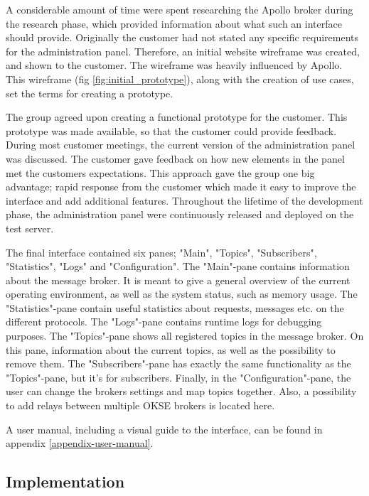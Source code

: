 A considerable amount of time were spent researching the Apollo broker during the research phase, which provided information about what such an interface should provide. Originally the customer had not stated any specific requirements for the administration panel. Therefore, an initial website wireframe was created, and shown to the customer. The wireframe was heavily influenced by Apollo. This wireframe (fig \ref{fig:initial_prototype}), along with the creation of use cases, set the terms for creating a prototype.

The group agreed upon creating a functional prototype for the customer. This prototype was made available, so that the customer could provide feedback. During most customer meetings, the current version of the administration panel was discussed. The customer gave feedback on how new elements in the panel met the customers expectations. This approach gave the group one big advantage; rapid response from the customer which made it easy to improve the interface and add additional features. Throughout the lifetime of the development phase, the administration panel were continuously released and deployed on the test server.

The final interface contained six panes; "Main", "Topics", "Subscribers", "Statistics", "Logs" and "Configuration". The "Main"-pane contains information about the message broker. It is meant to give a general overview of the current operating environment, as well as the system status, such as memory usage. The "Statistics"-pane contain useful statistics about requests, messages etc. on the different protocols. The "Logs"-pane contains runtime logs for debugging purposes. The "Topics"-pane shows all registered topics in the message broker. On this pane, information about the current topics, as well as the possibility to remove them. The "Subscribers"-pane has exactly the same functionality as the "Topics"-pane, but it's for subscribers. Finally, in the "Configuration"-pane, the user can change the brokers settings and map topics together. Also, a possibility to add relays between multiple OKSE brokers is located here.

A user manual, including a visual guide to the interface, can be found in appendix \ref{appendix-user-manual}.

\subsection{Implementation}
\label{subsec:architecture_and_implementation-implementation}


